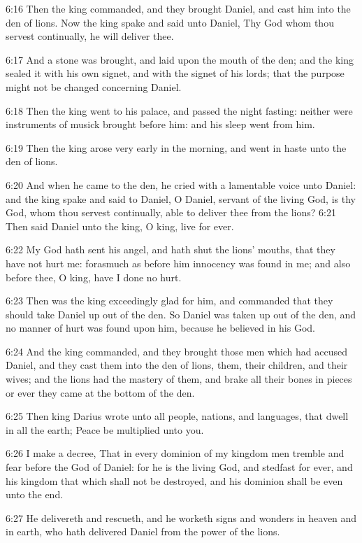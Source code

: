 6:16 Then the king commanded, and they brought Daniel, and cast him
into the den of lions. Now the king spake and said unto Daniel, Thy
God whom thou servest continually, he will deliver thee.

6:17 And a stone was brought, and laid upon the mouth of the den; and
the king sealed it with his own signet, and with the signet of his
lords; that the purpose might not be changed concerning Daniel.

6:18 Then the king went to his palace, and passed the night fasting:
neither were instruments of musick brought before him: and his sleep
went from him.

6:19 Then the king arose very early in the morning, and went in haste
unto the den of lions.

6:20 And when he came to the den, he cried with a lamentable voice
unto Daniel: and the king spake and said to Daniel, O Daniel, servant
of the living God, is thy God, whom thou servest continually, able to
deliver thee from the lions?  6:21 Then said Daniel unto the king, O
king, live for ever.

6:22 My God hath sent his angel, and hath shut the lions' mouths, that
they have not hurt me: forasmuch as before him innocency was found in
me; and also before thee, O king, have I done no hurt.

6:23 Then was the king exceedingly glad for him, and commanded that
they should take Daniel up out of the den. So Daniel was taken up out
of the den, and no manner of hurt was found upon him, because he
believed in his God.

6:24 And the king commanded, and they brought those men which had
accused Daniel, and they cast them into the den of lions, them, their
children, and their wives; and the lions had the mastery of them, and
brake all their bones in pieces or ever they came at the bottom of the
den.

6:25 Then king Darius wrote unto all people, nations, and languages,
that dwell in all the earth; Peace be multiplied unto you.

6:26 I make a decree, That in every dominion of my kingdom men tremble
and fear before the God of Daniel: for he is the living God, and
stedfast for ever, and his kingdom that which shall not be destroyed,
and his dominion shall be even unto the end.

6:27 He delivereth and rescueth, and he worketh signs and wonders in
heaven and in earth, who hath delivered Daniel from the power of the
lions.

